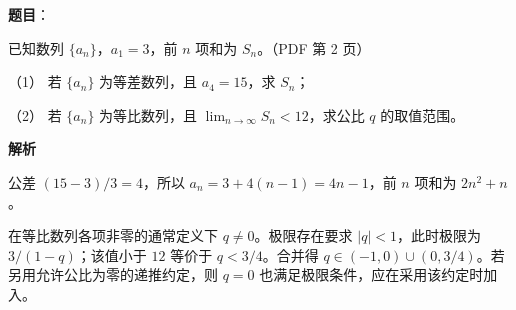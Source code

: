 \begin{answer}

\textbf{题目}：

已知数列 $\{a_n\}$，$a_1=3$，前 $n$ 项和为 $S_n$。（PDF 第 2 页）

（1） 若 $\{a_n\}$ 为等差数列，且 $a_4=15$，求 $S_n$；

（2） 若 $\{a_n\}$ 为等比数列，且 $\displaystyle\lim_{n\to\infty}S_n<12$，求公比 $q$ 的取值范围。

\textbf{解析}


公差 $(15-3)/3=4$，所以 $a_n=3+4(n-1)=4n-1$，前 $n$ 项和为 $2n^2+n$。


在等比数列各项非零的通常定义下 $q\ne0$。极限存在要求 $|q|<1$，此时极限为 $3/(1-q)$；该值小于 $12$ 等价于 $q<3/4$。合并得 $q\in(-1,0)\cup(0,3/4)$。若另用允许公比为零的递推约定，则 $q=0$ 也满足极限条件，应在采用该约定时加入。



\end{answer}
